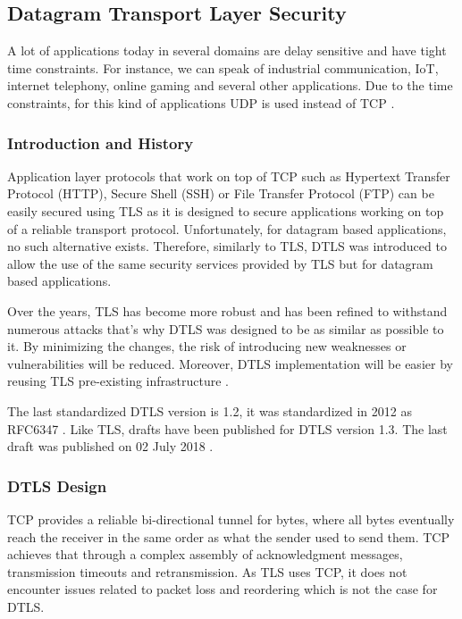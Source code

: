 \subsection{Datagram Transport Layer Security}

A lot of applications today in several domains are delay sensitive and have tight time constraints.
For instance, we can speak of industrial communication, IoT, internet telephony, online gaming and several other applications.
Due to the time constraints, for this kind of applications \ac{UDP} is used instead of \ac{TCP}   .

\subsubsection{Introduction and History}

Application layer protocols that work on top of \ac{TCP} such as Hypertext Transfer
Protocol (HTTP), Secure Shell (SSH) or File Transfer Protocol (FTP) can be easily secured using
\ac{TLS} as it is designed to secure applications working on top of a reliable transport protocol. Unfortunately,
for datagram based applications, no such alternative exists. Therefore, similarly to TLS, DTLS
was introduced to allow the use of the same security services provided by \ac{TLS} but for datagram based applications.

Over the years, \ac{TLS} has become more robust and has been refined to withstand numerous attacks that's why
\ac{DTLS} was designed to be as similar as possible to it. By minimizing the changes, the risk of introducing new weaknesses
or vulnerabilities will be reduced. Moreover, \ac{DTLS} implementation will be easier by reusing \ac{TLS} pre-existing infrastructure \cite{designAndImlementationOfDTLS}.

The last standardized \ac{DTLS} version is 1.2, it was standardized in 2012 as RFC6347 \cite{rfc6347}. Like TLS,
drafts have been published for \ac{DTLS} version 1.3. The last draft was published on 02 July 2018 \cite{draftDTLSv1.3}.

\subsubsection{\ac{DTLS} Design}

\ac{TCP}   provides a reliable bi-directional tunnel for bytes, where all bytes eventually reach the receiver
in the same order as what the sender used to send them. \ac{TCP} achieves that through a complex
assembly of acknowledgment messages, transmission timeouts and retransmission. As \ac{TLS} uses \ac{TCP},
it does not encounter issues related to packet loss and reordering which is not the case for DTLS.

